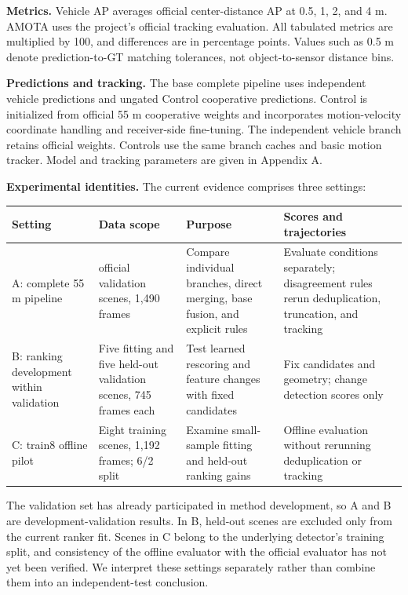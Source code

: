 \textbf{Metrics.} Vehicle AP averages official center-distance AP at 0.5, 1, 2, and 4 m. AMOTA uses the project's official tracking evaluation. All tabulated metrics are multiplied by 100, and differences are in percentage points. Values such as 0.5 m denote prediction-to-GT matching tolerances, not object-to-sensor distance bins.

\textbf{Predictions and tracking.} The base complete pipeline uses independent vehicle predictions and ungated Control cooperative predictions. Control is initialized from official 55 m cooperative weights and incorporates motion-velocity coordinate handling and receiver-side fine-tuning. The independent vehicle branch retains official weights. Controls use the same branch caches and basic motion tracker. Model and tracking parameters are given in Appendix A.

\textbf{Experimental identities.} The current evidence comprises three settings:

\begin{table}[t]
\centering
\small
\setlength{\tabcolsep}{3pt}
\renewcommand{\arraystretch}{1.12}
\setlength{\tableusable}{\dimexpr\linewidth-8\tabcolsep\relax}
\begin{tabular}{>{\raggedright\arraybackslash}p{0.4000\tableusable}>{\raggedright\arraybackslash}p{0.2000\tableusable}>{\raggedright\arraybackslash}p{0.2000\tableusable}>{\raggedright\arraybackslash}p{0.2000\tableusable}}
\toprule
Setting & Data scope & Purpose & Scores and trajectories \\
\midrule
A: complete 55 m pipeline & 10 official validation scenes, 1,490 frames & Compare individual branches, direct merging, base fusion, and explicit rules & Evaluate conditions separately; disagreement rules rerun deduplication, truncation, and tracking \\
B: ranking development within validation & Five fitting and five held-out validation scenes, 745 frames each & Test learned rescoring and feature changes with fixed candidates & Fix candidates and geometry; change detection scores only \\
C: train8 offline pilot & Eight training scenes, 1,192 frames; 6/2 split & Examine small-sample fitting and held-out ranking gains & Offline evaluation without rerunning deduplication or tracking \\
\bottomrule
\end{tabular}
\end{table}

The validation set has already participated in method development, so A and B are development-validation results. In B, held-out scenes are excluded only from the current ranker fit. Scenes in C belong to the underlying detector's training split, and consistency of the offline evaluator with the official evaluator has not yet been verified. We interpret these settings separately rather than combine them into an independent-test conclusion.

